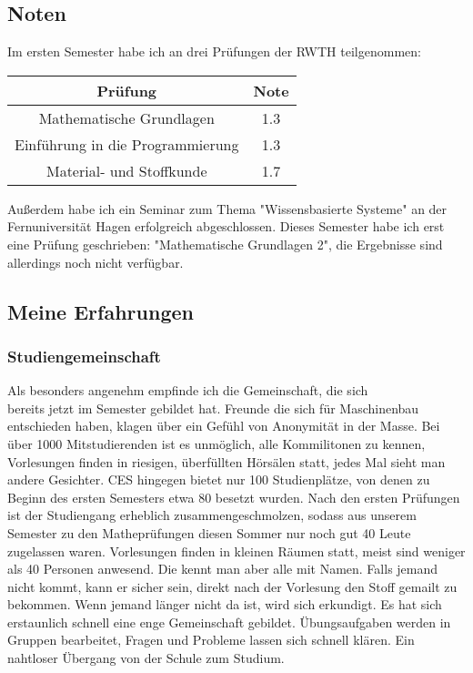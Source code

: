 \documentclass[12pt]{article}
\begin{document}
\begin{large}
\subsection*{Noten}
Im ersten Semester habe ich an drei Prüfungen der RWTH teilgenommen:
\newline
\newline
\begin{tabular}{|c|c|}
\hline 
Prüfung & Note \\ 
\hline 
Mathematische Grundlagen & 1.3 \\ 
\hline 
Einführung in die Programmierung & 1.3 \\ 
\hline 
Material- und Stoffkunde & 1.7 \\ 
\hline 
\end{tabular} 
\newline
\bigskip
\newline
Außerdem habe ich ein Seminar zum Thema "Wissensbasierte Systeme" an der Fernuniversität Hagen erfolgreich abgeschlossen.
\newline
Dieses Semester habe ich erst eine Prüfung geschrieben: "Mathematische Grundlagen 2", die Ergebnisse sind allerdings noch nicht verfügbar.
\newline
\newline
\pagebreak
\subsection*{Meine Erfahrungen}
\subsubsection*{Studiengemeinschaft}
Als besonders angenehm empfinde ich die Gemeinschaft, die sich \\bereits jetzt im Semester gebildet hat. Freunde die sich für Maschinenbau entschieden haben, klagen über ein Gefühl von Anonymität in der Masse. Bei über 1000 Mitstudierenden ist es unmöglich, alle Kommilitonen zu kennen, Vorlesungen finden in riesigen, überfüllten Hörsälen statt, jedes Mal sieht man andere Gesichter. CES hingegen bietet  nur 100 Studienplätze, von denen zu Beginn des ersten Semesters etwa 80 besetzt wurden. Nach den ersten Prüfungen ist der Studiengang erheblich zusammengeschmolzen, sodass aus unserem Semester zu den Matheprüfungen diesen Sommer nur noch gut 40 Leute zugelassen waren.  Vorlesungen finden in kleinen Räumen statt, meist sind weniger als 40 Personen anwesend. Die kennt man aber alle mit Namen. Falls jemand nicht kommt, kann er sicher sein, direkt nach der Vorlesung den Stoff gemailt zu bekommen. Wenn jemand länger nicht da ist, wird sich erkundigt. Es hat sich erstaunlich schnell eine enge Gemeinschaft gebildet. Übungsaufgaben werden in Gruppen bearbeitet, Fragen und Probleme lassen sich schnell klären. Ein nahtloser Übergang von der Schule zum Studium.
\newline


\end{large}
\end{document}
